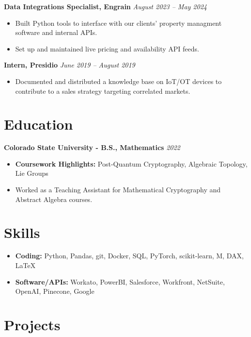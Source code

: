 \documentclass[a4paper,10pt]{article}
\newcommand{\resumeEntry}[2]{%
  \noindent\textbf{#1} \hfill \textit{#2}\par\vspace{-0.5ex}%
}
\begin{document}
\resumeEntry{Data Integrations Specialist, Engrain}{August 2023 -- May 2024}
\begin{itemize}[leftmargin=*, noitemsep]
    \item Built Python tools to interface with our clients' property managment software and internal APIs.
    \item Set up and maintained live pricing and availability API feeds.
\end{itemize}

\resumeEntry{Intern, Presidio}{June 2019 -- August 2019}
\begin{itemize}[leftmargin=*, noitemsep]
    \item Documented and distributed a knowledge base on IoT/OT devices to contribute to a sales strategy 
    targeting correlated markets.
\end{itemize}

\section*{Education}

\resumeEntry{Colorado State University - B.S., Mathematics}{2022}
\begin{itemize}[leftmargin=*, noitemsep]
    \item \textbf{Coursework Highlights:} Post-Quantum Cryptography, Algebraic Topology, Lie Groups
    \item Worked as a Teaching Assistant for Mathematical Cryptography and Abstract Algebra courses.
\end{itemize}

\section*{Skills}
\begin{itemize}[leftmargin=*, noitemsep]
    \item \textbf{Coding:} Python, Pandas, git, Docker, SQL, PyTorch, scikit-learn, M, DAX, LaTeX
    \item \textbf{Software/APIs:} Workato, PowerBI, Salesforce, Workfront, NetSuite, OpenAI, Pinecone, Google
\end{itemize}

\section*{Projects}
\end{document}
